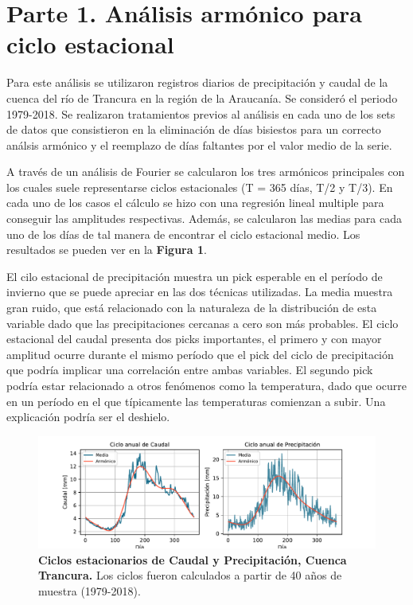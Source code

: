 


\section*{Parte 1. Análisis armónico para ciclo estacional}

\bigskip

Para este análisis se utilizaron registros diarios de precipitación y caudal de la cuenca del río de Trancura en la región de la Araucanía. Se consideró el periodo 1979-2018. Se realizaron tratamientos previos al análisis en cada uno de los sets de datos que consistieron en la eliminación de días bisiestos para un correcto análsis armónico y el reemplazo de días faltantes por el valor medio de la serie.  

\bigskip

A través de un análisis de Fourier se calcularon los tres armónicos principales con los cuales suele representarse ciclos estacionales (T = 365 días, T/2 y  T/3). En cada uno de los casos el cálculo se hizo con una regresión lineal multiple para conseguir las amplitudes respectivas. Además, se calcularon las medias para cada uno de los días de tal manera de encontrar el ciclo estacional medio. Los resultados se pueden ver en la \textbf{Figura 1}.  

\bigskip

El cilo estacional de precipitación muestra un pick esperable en el período de invierno que se puede apreciar en las dos técnicas utilizadas. La media muestra gran ruido, que está relacionado con la naturaleza de la distribución de esta variable dado que las precipitaciones cercanas a cero son más probables. El ciclo estacional del caudal presenta dos picks importantes, el primero y con mayor amplitud ocurre durante el mismo período que el pick del ciclo de precipitación que podría implicar una correlación entre ambas variables. El segundo pick podría estar relacionado a otros fenómenos como la temperatura, dado que ocurre en un período en el que típicamente las temperaturas comienzan a subir. Una explicación podría ser el deshielo. 

\begin{figure}[htp]
\centering
\includegraphics[width=1\textwidth]{img/ciclos.pdf}
\caption{\textbf{Ciclos estacionarios de Caudal y Precipitación, Cuenca Trancura.} Los ciclos fueron calculados a partir de 40 años de muestra (1979-2018). }
\label{fig:1}
\end{figure}

